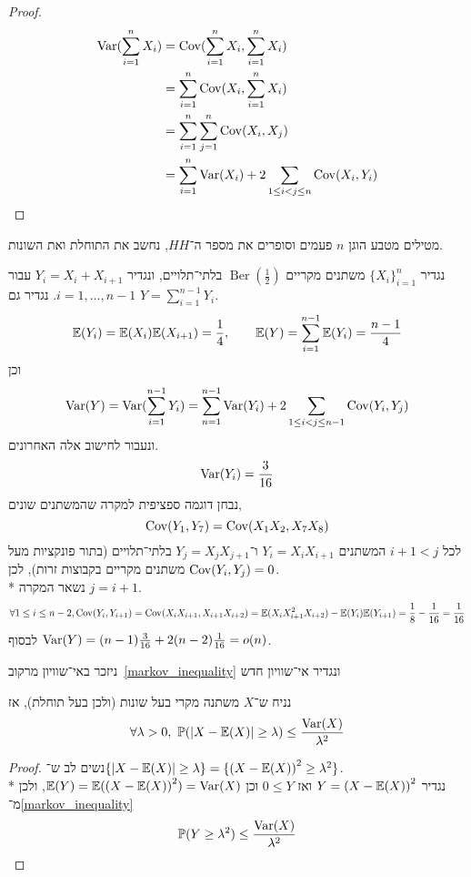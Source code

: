 \begin{proof}
	\begin{align*}
		\operatorname{Var}(\sum_{i = 1}^{n} X_i)
		& = \operatorname{Cov}(\sum_{i = 1}^{n} X_i, \sum_{i = 1}^{n} X_i) \\
		& = \sum_{i = 1}^n \operatorname{Cov}(X_i, \sum_{i = 1}^{n} X_i) \\
		& = \sum_{i = 1}^n \sum_{j = 1}^n \operatorname{Cov}(X_i, X_j) \\
		& = \sum_{i = 1}^{n} \operatorname{Var}(X_i) + 2 \sum_{1 \le i < j \le n} \operatorname{Cov}(X_i, Y_i)
	\end{align*}
\end{proof}
\begin{example}
	מטילים מטבע הוגן $n$ פעמים וסופרים את מספר ה־$HH$, נחשב את התוחלת ואת השונות.

	נגדיר ${\{X_i\}}_{i = 1}^n$ משתנים מקריים $\operatorname{Ber}(\frac{1}{2})$ בלתי־תלויים, ונגדיר $Y_i = X_i + X_{i + 1}$ עבור $i = 1, \dots, n - 1$.
	נגדיר גם $Y = \sum_{i = 1}^{n - 1} Y_i$.
	\[
		\mathbb{E}(Y_i) = \mathbb{E}(X_i) \mathbb{E}(X_{i + 1}) = \frac{1}{4},
		\qquad
		\mathbb{E}(Y) = \sum_{i = 1}^{n - 1} \mathbb{E}(Y_i) = \frac{n - 1}{4}
	\]
	וכן
	\[
		\operatorname{Var}(Y)
		= \operatorname{Var}(\sum_{i = 1}^{n - 1} Y_i)
		= \sum_{n = 1}^{n - 1} \operatorname{Var}(Y_i) + 2 \sum_{1 \le i < j \le n - 1} \operatorname{Cov}(Y_i, Y_j)
	\]
	ונעבור לחישוב אלה האחרונים.
	\[
		\operatorname{Var}(Y_i) = \frac{3}{16}
	\]
	נבחן דוגמה ספציפית למקרה שהמשתנים שונים,
	\[
		\operatorname{Cov}(Y_1, Y_7)
		= \operatorname{Cov}(X_1 X_2, X_7 X_8)
	\]
	לכל $i + 1 < j$ המשתנים $Y_i = X_i X_{i + 1}$ ו־$Y_j = X_j X_{j + 1}$ בלתי־תלויים (בתור פונקציות מעל משתנים מקריים בקבוצות זרות), לכן $\operatorname{Cov}(Y_i, Y_j) = 0$. \\*
	נשאר המקרה $j = i + 1$.
	\[
		\forall 1 \le i \le n - 2, \operatorname{Cov}(Y_i, Y_{i + 1})
		= \operatorname{Cov}(X_i X_{i + 1}, X_{i + 1} X_{i + 2})
		= \mathbb{E}(X_i X_{i + 1}^2 X_{i + 2}) - \mathbb{E}(Y_i)\mathbb{E}(Y_{i + 1})
		= \frac{1}{8} - \frac{1}{16}
		= \frac{1}{16}
	\]
	לבסוף $\operatorname{Var}(Y) = (n - 1) \frac{3}{16} + 2(n - 2) \frac{1}{16} = o(n)$.
\end{example}
ניזכר באי־שוויון מרקוב\ \ref{markov_inequality} ונגדיר אי־שוויון חדש
\begin{theorem}
	נניח ש־$X$ משתנה מקרי בעל שונות (ולכן בעל תוחלת), אז
	\[
		\forall \lambda > 0,\ 
		\PP(|X - \EE(X)| \ge \lambda) \le \frac{\var(X)}{\lambda^2}
	\]
\end{theorem}
\begin{proof}
	נשים לב ש־$\{ |X - \mathbb{E}(X)| \ge \lambda \} = \{ {(X - \mathbb{E}(X))}^2 \ge \lambda^2 \}$. \\*
	נגדיר $Y = {(X - \mathbb{E}(X))}^2$ ואז $0 \le Y$ וכן $\mathbb{E}(Y) = \mathbb{E}({(X - \mathbb{E}(X))}^2) = \operatorname{Var}(X)$, ולכן מ־\ref{markov_inequality}
	\[
		\mathbb{P}(Y \ge \lambda^2) \le \frac{\operatorname{Var}(X)}{\lambda^2}
	\]
\end{proof}

